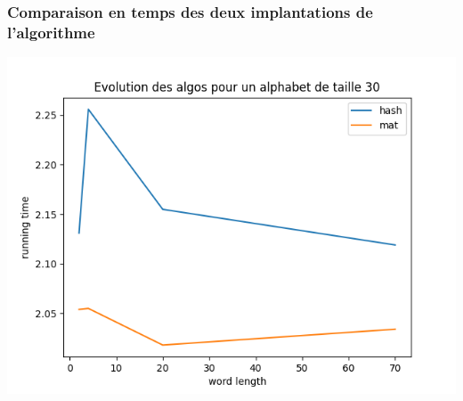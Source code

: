 \documentclass{beamer}
\begin{document}
  \begin{frame}
    \frametitle{Comparaison en temps des deux implantations de l'algorithme}
    \begin{center}
      \includegraphics[scale = 0.5]{../Courbes/word_30.png}
    \end{center}
  \end{frame}
\end{document}

